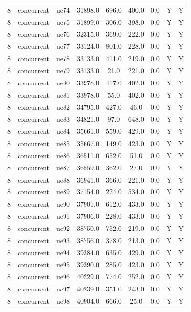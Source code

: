 \begin{table}[ht]
\begin{tabular}{|c|c|c|c|c|c|c|c|c|}
8 & concurrent & ue74 & 31898.0 & 696.0 & 400.0 & 0.0 & Y & Y \\
8 & concurrent & ue75 & 31899.0 & 306.0 & 398.0 & 0.0 & Y & Y \\
8 & concurrent & ue76 & 32315.0 & 369.0 & 222.0 & 0.0 & Y & Y \\
8 & concurrent & ue77 & 33124.0 & 801.0 & 228.0 & 0.0 & Y & Y \\
8 & concurrent & ue78 & 33133.0 & 411.0 & 219.0 & 0.0 & Y & Y \\
8 & concurrent & ue79 & 33133.0 & 21.0 & 221.0 & 0.0 & Y & Y \\
8 & concurrent & ue80 & 33978.0 & 417.0 & 402.0 & 0.0 & Y & Y \\
8 & concurrent & ue81 & 33978.0 & 55.0 & 402.0 & 0.0 & Y & Y \\
8 & concurrent & ue82 & 34795.0 & 427.0 & 46.0 & 0.0 & Y & Y \\
8 & concurrent & ue83 & 34821.0 & 97.0 & 648.0 & 0.0 & Y & Y \\
8 & concurrent & ue84 & 35661.0 & 559.0 & 429.0 & 0.0 & Y & Y \\
8 & concurrent & ue85 & 35667.0 & 149.0 & 423.0 & 0.0 & Y & Y \\
8 & concurrent & ue86 & 36511.0 & 652.0 & 51.0 & 0.0 & Y & Y \\
8 & concurrent & ue87 & 36559.0 & 362.0 & 27.0 & 0.0 & Y & Y \\
8 & concurrent & ue88 & 36941.0 & 366.0 & 221.0 & 0.0 & Y & Y \\
8 & concurrent & ue89 & 37154.0 & 224.0 & 534.0 & 0.0 & Y & Y \\
8 & concurrent & ue90 & 37901.0 & 612.0 & 433.0 & 0.0 & Y & Y \\
8 & concurrent & ue91 & 37906.0 & 228.0 & 433.0 & 0.0 & Y & Y \\
8 & concurrent & ue92 & 38750.0 & 752.0 & 219.0 & 0.0 & Y & Y \\
8 & concurrent & ue93 & 38756.0 & 378.0 & 213.0 & 0.0 & Y & Y \\
8 & concurrent & ue94 & 39384.0 & 635.0 & 429.0 & 0.0 & Y & Y \\
8 & concurrent & ue95 & 39390.0 & 285.0 & 423.0 & 0.0 & Y & Y \\
8 & concurrent & ue96 & 40229.0 & 774.0 & 252.0 & 0.0 & Y & Y \\
8 & concurrent & ue97 & 40239.0 & 351.0 & 243.0 & 0.0 & Y & Y \\
8 & concurrent & ue98 & 40904.0 & 666.0 & 25.0 & 0.0 & Y & Y \\

\end{tabular}
\end{table}
